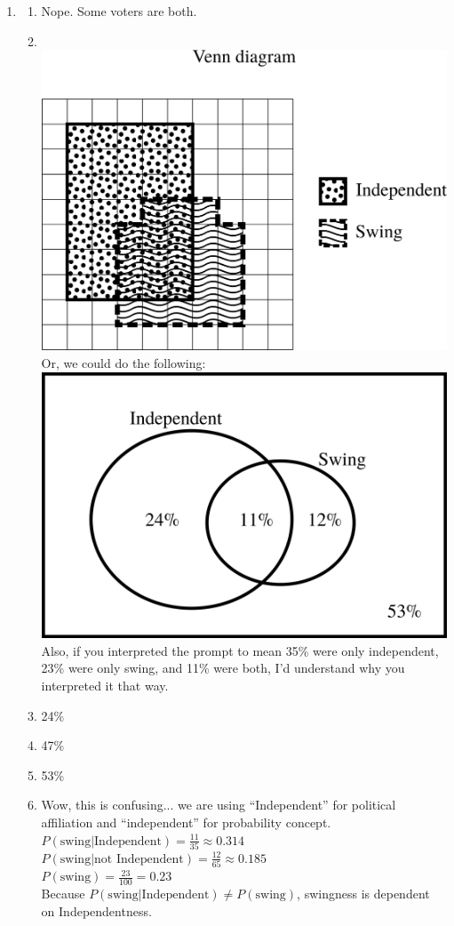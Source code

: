 \documentclass[12pt,letterpaper]{article}
\begin{document}
\begin{enumerate}
\item \begin{enumerate}
\item Nope. Some voters are both.
\item ~\\ \includegraphics[scale=0.6]{figures/venn.png}
\\
Or, we could do the following:~\\ 
\includegraphics[scale=0.5]{figures/venn2.png}
\\
Also, if you interpreted the prompt to mean 35\% were only independent, 23\% were only swing, and 11\% were both, I'd understand why you interpreted it that way.
\item 24\%
\item 47\%
\item 53\%
\item Wow, this is confusing... we are using ``Independent'' for political affiliation and ``independent'' for probability concept. 
\\
$P(\text{swing}|\text{Independent}) = \frac{11}{35} \approx 0.314$
\\
$P(\text{swing}|\text{not Independent}) = \frac{12}{65} \approx 0.185$
\\
$P(\text{swing}) = \frac{23}{100} = 0.23$
\\
Because $P(\text{swing}|\text{Independent}) \ne P(\text{swing})$, swingness is dependent on Independentness.


\end{enumerate}
\end{enumerate}
\end{document}
